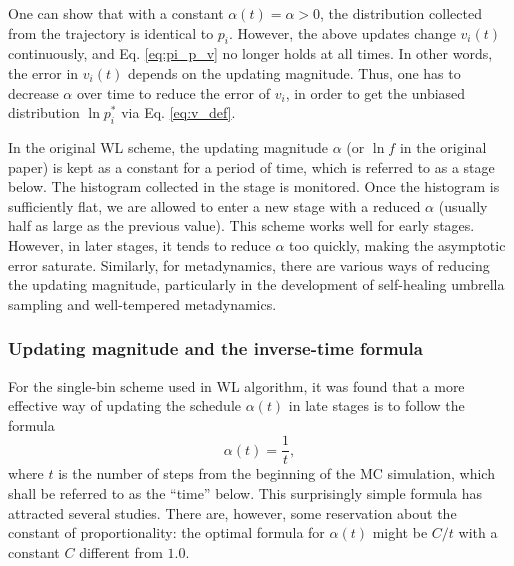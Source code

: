 \documentclass[reprint, floatfix]{revtex4-1}
\begin{document}
One can show that with a constant $\alpha(t) = \alpha > 0$,
the distribution collected from
the trajectory is identical to $p_i$.
%
However, the above updates
change $v_i(t)$ continuously,
and Eq. \eqref{eq:pi_p_v} no longer holds
at all times.
%
In other words,
the error in $v_i(t)$
depends on the updating magnitude\cite{
  zhou2005, liang2005, laio2005, bussi2006, poulain2006, liang2007,
  morozov2007, zhou2008, morozov2009, crespo2010,
  atchade2011, fort2015}.
%
Thus, one has to decrease $\alpha$ over time
to reduce the error of $v_i$,
in order to get the unbiased distribution
$\ln p_i^*$ via Eq. \eqref{eq:v_def}.





In the original WL scheme,
the updating magnitude $\alpha$ (or $\ln f$
in the original paper) is kept as a constant
for a period of time,
which is referred to as a stage below.
%
The histogram collected in the stage is monitored.
%
Once the histogram is sufficiently flat,
we are allowed to enter a new stage
with a reduced $\alpha$\cite{wang2001, wang2001pre}
(usually half as large as
the previous value).
%
This scheme works well for early stages.
%
However, in later stages, it tends to reduce $\alpha$
too quickly, making the asymptotic error
saturate\cite{belardinelli2007, belardinelli2007jcp, belardinelli2008}.
%
Similarly, for metadynamics,
there are various ways of reducing the updating magnitude,
particularly in the development of
self-healing umbrella sampling
and well-tempered metadynamics\cite{
  marsili2006, barducci2008, dickson2011, dama2014}.




\subsubsection{Updating magnitude and the inverse-time formula}



For the single-bin scheme
used in WL algorithm,
it was found that
a more effective way
of updating the schedule $\alpha(t)$
in late stages
is to follow the formula
%
\begin{equation}
  \alpha(t) = \frac{1}{t},
  \label{eq:alpha_invt}
\end{equation}
%
where $t$ is the number of steps
from the beginning of the MC simulation,
which shall be referred to as the ``time'' below.
%
This surprisingly simple formula has attracted
several studies\cite{belardinelli2007, belardinelli2007jcp, belardinelli2008,
morozov2007, zhou2008, morozov2009,
komura2012, caparica2012, caparica2014}.
%
There are, however, some reservation about
the constant of proportionality:
the optimal formula for $\alpha(t)$
might be $C/t$ with a constant $C$
different from $1.0$\cite{
morozov2007, zhou2008, morozov2009}.
\end{document}
